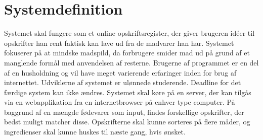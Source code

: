 \section{Systemdefinition}

Systemet skal fungere som et online opskriftsregister, der giver brugeren idéer til opskrifter han rent faktisk kan lave ud fra de madvarer han har. Systemet fokuserer på at mindske madspild, da forbrugere smider mad ud på grund af et manglende formål med anvendelsen af resterne. Brugerne af programmet er en del af en husholdning og vil have meget varierende erfaringer inden for brug af internettet. Udviklerne af systemet er ulønnede studerende. Deadline for det færdige system kan ikke ændres. Systemet skal køre på en server, der kan tilgås via en webapplikation fra en internetbrowser på enhver type computer. På baggrund af en mængde fødevarer som input, findes forskellige opskrifter, der bedst muligt matcher disse. Opskrifterne skal kunne sorteres på flere måder, og ingredienser skal kunne huskes til næste gang, hvis ønsket.

